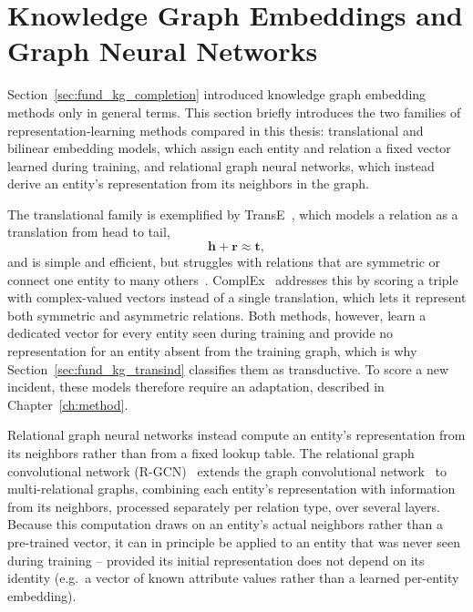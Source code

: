 \section{Knowledge Graph Embeddings and Graph Neural Networks}\label{sec:fund_kge}

Section~\ref{sec:fund_kg_completion} introduced knowledge graph embedding
methods only in general terms. This section briefly introduces the two
families of representation-learning methods compared in this thesis:
translational and bilinear embedding models, which assign each entity and
relation a fixed vector learned during training, and relational graph
neural networks, which instead derive an entity's representation from its
neighbors in the graph.

The translational family is exemplified by TransE~\cite{bordes2013transe},
which models a relation as a translation from head to tail,
\[
  \mathbf{h} + \mathbf{r} \approx \mathbf{t},
\]
and is simple and efficient, but struggles with relations that are
symmetric or connect one entity to many others~\cite{wang2017kgesurvey}.
ComplEx~\cite{trouillon2016complex} addresses this by scoring a triple
with complex-valued vectors instead of a single translation, which lets
it represent both symmetric and asymmetric relations. Both methods,
however, learn a dedicated vector for every entity seen during training
and provide no representation for an entity absent from the training
graph, which is why Section~\ref{sec:fund_kg_transind} classifies them as
transductive. To score a new incident, these models therefore require an
adaptation, described in Chapter~\ref{ch:method}.

Relational graph neural networks instead compute an entity's
representation from its neighbors rather than from a fixed lookup table.
The relational graph convolutional network
(R-GCN)~\cite{schlichtkrull2018rgcn} extends the graph convolutional
network~\cite{kipf2017gcn} to multi-relational graphs, combining each
entity's representation with information from its neighbors, processed
separately per relation type, over several layers. Because this
computation draws on an entity's actual neighbors rather than a
pre-trained vector, it can in principle be applied to an entity that was
never seen during training -- provided its initial representation does
not depend on its identity (e.g.\ a vector of known attribute values
rather than a learned per-entity embedding).

